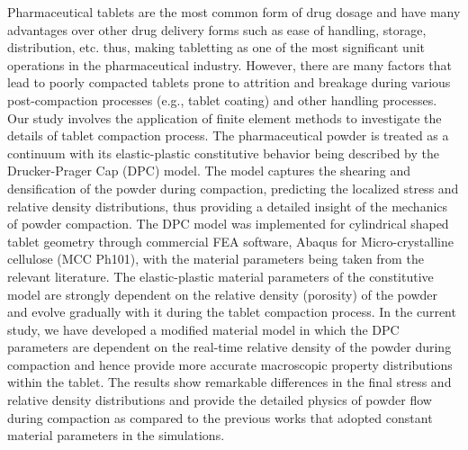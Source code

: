 Pharmaceutical tablets are the most common form of drug dosage and have many advantages over other drug delivery forms such as ease of handling, storage, distribution, etc. thus, making tabletting as one of the most significant unit operations in the pharmaceutical industry. However, there are many factors that lead to poorly compacted tablets prone to attrition and breakage during various post-compaction processes (e.g., tablet coating) and other handling processes. Our study involves the application of finite element methods to investigate the details of tablet compaction process. The pharmaceutical powder is treated as a continuum with its elastic-plastic constitutive behavior being described by the Drucker-Prager Cap (DPC) model. The model captures the shearing and densification of the powder during compaction, predicting the localized stress and relative density distributions, thus providing a detailed insight of the mechanics of powder compaction. The DPC model was implemented for cylindrical shaped tablet geometry through commercial FEA software, Abaqus for Micro-crystalline cellulose (MCC Ph101), with the material parameters being taken from the relevant literature. The elastic-plastic material parameters of the constitutive model are strongly dependent on the relative density (porosity) of the powder and evolve gradually with it during the tablet compaction process. In the current study, we have developed a modified material model in which the DPC parameters are dependent on the real-time relative density of the powder during compaction and hence provide more accurate macroscopic property distributions within the tablet. The results show remarkable differences in the final stress and relative density distributions and provide the detailed physics of powder flow during compaction as compared to the previous works that adopted constant material parameters in the simulations.
 

